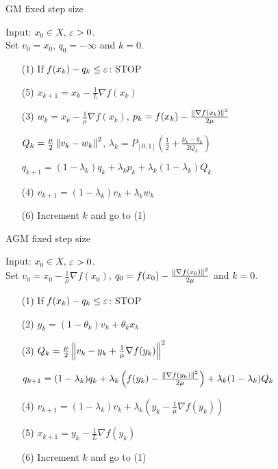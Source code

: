 \documentclass[english,12pt,a4paper]{article}
\begin{document}
%
\begin{yellow}
\begin{algorithm}[H]
\caption{GM fixed step size} 
\label{algorithm:AGMfixed} 
%
Input: $x_0\in X$, $\varepsilon>0$.\\ Set $v_{0}=x_0$, $q_0=-\infty$ and $k=0$.
%
\begin{itemize}
\item[(1)] If $f(x_k)-q_k \le \varepsilon$: STOP
\item[(5)] $x_{k+1} = x_k  - \frac{1}{L}\nabla f(x_k)$
\item[(3)] $w_k=x_k - \frac{1}{\mu}\nabla f(x_k)$,  $p_k=f(x_k) - \frac{\left\|\nabla f(x_k)\right\|^2}{2\mu}$
\item[] $Q_{k} = \frac{\mu}{2}\left\|v_k -w_k\right\|^2$, $\lambda_{k} = P_{[0,1]}\left(\frac12 + \frac{p_k-q_k}{2Q_k}\right)$
\item[] $q_{k+1} = (1-\lambda_k) q_k + \lambda_k p_k + \lambda_k(1-\lambda_k)Q_{k}$
\item[(4)] $v_{k+1} = (1-\lambda_k) v_{k} + \lambda_k w_k$
\item[(6)] Increment $k$ and go to (1)
\end{itemize}
%
\end{algorithm}
\end{yellow}
%

%
\begin{yellow}
\begin{algorithm}[H]
\caption{AGM fixed step size} 
\label{algorithm:AGMfixed} 
%
Input: $x_0\in X$, $\varepsilon>0$.\\ Set $v_{0}=x_0- \frac{1}{\mu}\nabla f(x_0)$, $q_0=f(x_0) - \frac{\left\|\nabla f(x_0)\right\|^2}{2\mu}$ and $k=0$.
%
\begin{itemize}
\item[(1)] If $f(x_k)-q_k \le \varepsilon$: STOP
\item[(2)] $y_{k} = (1-\theta_k)v_k + \theta_k x_{k}$
\item[(3)] $Q_{k} = \frac{\mu}{2}\left\|v_k -y_k + \frac{1}{\mu}\nabla f(y_k)\right\|^2$
\item[] $q_{k+1} = (1-\lambda_k) q_k + \lambda_k\left(  f(y_k) - \frac{\left\|\nabla f(y_k)\right\|^2}{2\mu}\right) + \lambda_k(1-\lambda_k)Q_{k}$
\item[(4)] $v_{k+1} = (1-\lambda_k) v_{k} + \lambda_k \left( y_k - \frac{1}{\mu}\nabla f(y_k)\right)$
\item[(5)] $x_{k+1} = y_{k}  - \frac{1}{L}\nabla f(y_k)$
\item[(6)] Increment $k$ and go to (1)
\end{itemize}
%
\end{algorithm}
\end{yellow}
%
\end{document}
